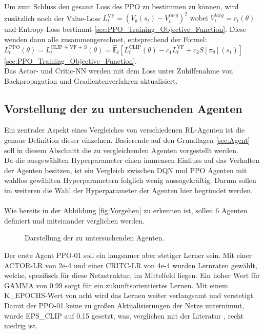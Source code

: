 Um zum Schluss den gesamt Loss des PPO zu bestimmen zu können, wird zusätzlich noch der Value-Loss $L^{\text{VF}}_{t} = (V_{\theta}(s_{t})-V_{t}^{targ})^2 \text{ wobei } V_{t}^{targ} = r_{t}(\theta)$ und Entropy-Loss bestimmt \ref{sec:PPO_Training_Objective_Function}. Diese wenden dann alle zusammengerechnet, entsprechend der Formel: 
$L^\text{PPO}_{t} (\theta) = L^\text{CLIP + VF + S}_{t} (\theta) = \mathbb{\hat{E}}_{t} [L^{\text{CLIP}}_{t}(\theta) - c_{1}L^{\text{VF}}_{t} + c_{2}S[\pi_{\theta}](s_{t})]$ \ref{sec:PPO_Training_Objective_Function}.\\
Das Actor- und Critic-NN werden mit dem Loss unter Zuhilfenahme von Backpropagation und Gradientenverfahren aktualisiert.

\subsection{Vorstellung der zu untersuchenden Agenten}
Ein zentraler Aspekt eines Vergleiches von verschiedenen RL-Agenten ist die genaue Definition dieser einzelnen. 
Basierende auf den Grundlagen \ref{sec:Agent} soll in diesem Abschnitt die zu vergleichenden Agenten vorgestellt werden.\\
Da die ausgewählten Hyperparameter einen immensen Einfluss auf das Verhalten der Agenten besitzen, ist ein Vergleich zwischen DQN und PPO Agenten mit wahllos gewählten Hyperparametern folglich wenig aussagekräftig. Darum sollen im weiteren die Wahl der Hyperparameter der Agenten hier begründet werden.\\
\\Wie bereits in der Abbildung \ref{fig:Vorgehen} zu erkennen ist, sollen 6 Agenten definiert und miteinander verglichen werden.
\begin{figure}[H]
	\centering
	\def\svgscale{0.102}
	
	\caption[Agenten]{Darstellung der zu untersuchenden Agenten.}
	\label{fig:Agenten}
\end{figure}
Der erste Agent PPO-01 soll ein langsamer aber stetiger Lerner sein. Mit einer ACTOR-LR von 2e-4 und einer CRITC-LR von 4e-4 wurden Lernraten gewählt, welche, spezifisch für diese Netzstruktur, im Mittelfeld liegen. Ein hoher Wert für GAMMA von 0.99 sorgt für ein zukunftsorientiertes Lernen. Mit einem K\_EPOCHS-Wert von acht wird das Lernen weiter verlangsamt und verstetigt. Damit der PPO-01 keine zu großen Aktualisierungen der Netze unternimmt, wurde EPS\_CLIP auf 0.15 gesetzt, was, verglichen mit der Literatur \cite[S. 6]{PPO}, recht niedrig ist.\\
